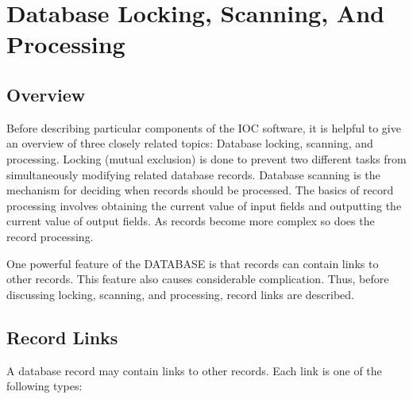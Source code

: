 \chapter{Database Locking, Scanning, And Processing}

\section{Overview}

Before describing particular components of the IOC software, it is helpful to give an overview of three closely related topics: Database locking, scanning, and processing.
Locking (mutual exclusion) is done to prevent two different tasks from simultaneously modifying related database records.
Database scanning is the mechanism for deciding when records should be processed.
The basics of record processing involves obtaining the current value of input fields and outputting the current value of output fields.
As records become more complex so does the record processing.

One powerful feature of the DATABASE is that records can contain links to other records.
This feature also causes considerable complication.
Thus, before discussing locking, scanning, and processing, record links are described.

\section{Record Links}

A database record may contain links to other records.
Each link is one of the following types:

